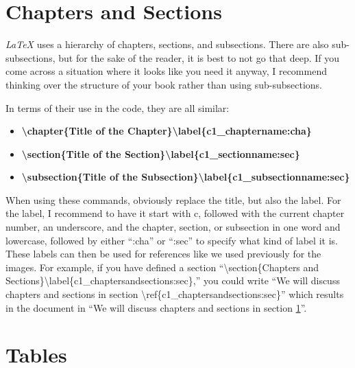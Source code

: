 \section{Chapters and Sections}\label{c1_chaptersandsections:sec}

\textit{LaTeX} uses a hierarchy of chapters, sections, and subsections. There are also sub-subsections, but for the sake of the reader, it is best to not go that deep. If you come across a situation where it looks like you need it anyway, I recommend thinking over the structure of your book rather than using sub-subsections. 

In terms of their use in the code, they are all similar:

\begin{itemize}
\item \textbf{\textbackslash chapter\{Title of the Chapter\}\textbackslash label\{c1\_chaptername:cha\}}
\item \textbf{\textbackslash section\{Title of the Section\}\textbackslash label\{c1\_sectionname:sec\}}
\item \textbf{\textbackslash subsection\{Title of the Subsection\}\textbackslash label\{c1\_subsectionname:sec\}}
\end{itemize}

When using these commands, obviously replace the title, but also the label. For the label, I recommend to have it start with c, followed with the current chapter number, an underscore, and the chapter, section, or subsection in one word and lowercase, followed by either ``:cha'' or ``:sec'' to specify what kind of label it is. These labels can then be used for references like we used previously for the images. For example, if you have defined a section ``\textbackslash section\{Chapters and Sections\}\textbackslash label\{c1\_chaptersandsections:sec\},'' you could write ``We will discuss chapters and sections in section \textbackslash ref\{c1\_chaptersandsections:sec\}'' which results in the document in ``We will discuss chapters and sections in section \ref{c1_chaptersandsections:sec}''.


\section{Tables}\label{c1_tables:sec}

